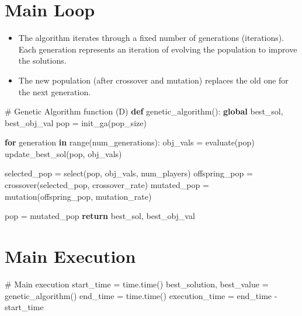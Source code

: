\documentclass[
  letterpaper,
  DIV=11,
  numbers=noendperiod]{scrreprt}
\newenvironment{Shaded}{\begin{snugshade}}{\end{snugshade}}
\newcommand{\BuiltInTok}[1]{\textcolor[rgb]{0.00,0.23,0.31}{#1}}
\newcommand{\CommentTok}[1]{\textcolor[rgb]{0.37,0.37,0.37}{#1}}
\newcommand{\ControlFlowTok}[1]{\textcolor[rgb]{0.00,0.23,0.31}{\textbf{#1}}}
\newcommand{\KeywordTok}[1]{\textcolor[rgb]{0.00,0.23,0.31}{\textbf{#1}}}
\newcommand{\NormalTok}[1]{\textcolor[rgb]{0.00,0.23,0.31}{#1}}
\newcommand{\OperatorTok}[1]{\textcolor[rgb]{0.37,0.37,0.37}{#1}}
\providecommand{\tightlist}{%
  \setlength{\itemsep}{0pt}\setlength{\parskip}{0pt}}\usepackage{longtable,booktabs,array}
\begin{document}
\section{Main Loop}\label{main-loop-3}

\begin{itemize}
\tightlist
\item
  The algorithm iterates through a fixed number of generations
  (iterations). Each generation represents an iteration of evolving the
  population to improve the solutions.
\item
  The new population (after crossover and mutation) replaces the old one
  for the next generation.
\end{itemize}

\begin{Shaded}
\begin{Highlighting}[]
\CommentTok{\# Genetic Algorithm function (D)}
\KeywordTok{def}\NormalTok{ genetic\_algorithm():}
    \KeywordTok{global}\NormalTok{ best\_sol, best\_obj\_val}
\NormalTok{    pop }\OperatorTok{=}\NormalTok{ init\_ga(pop\_size)}
    
    \ControlFlowTok{for}\NormalTok{ generation }\KeywordTok{in} \BuiltInTok{range}\NormalTok{(num\_generations):}
\NormalTok{        obj\_vals }\OperatorTok{=}\NormalTok{ evaluate(pop)}
\NormalTok{        update\_best\_sol(pop, obj\_vals)}
        
\NormalTok{        selected\_pop }\OperatorTok{=}\NormalTok{ select(pop, obj\_vals, num\_players)}
\NormalTok{        offspring\_pop }\OperatorTok{=}\NormalTok{ crossover(selected\_pop, crossover\_rate)}
\NormalTok{        mutated\_pop }\OperatorTok{=}\NormalTok{ mutation(offspring\_pop, mutation\_rate)}
        
\NormalTok{        pop }\OperatorTok{=}\NormalTok{ mutated\_pop  }
    \ControlFlowTok{return}\NormalTok{ best\_sol, best\_obj\_val}
\end{Highlighting}
\end{Shaded}

\section{Main Execution}\label{main-execution-4}

\begin{Shaded}
\begin{Highlighting}[]
\CommentTok{\# Main execution}
\NormalTok{start\_time }\OperatorTok{=}\NormalTok{ time.time()}
\NormalTok{best\_solution, best\_value }\OperatorTok{=}\NormalTok{ genetic\_algorithm()}
\NormalTok{end\_time }\OperatorTok{=}\NormalTok{ time.time()}
\NormalTok{execution\_time }\OperatorTok{=}\NormalTok{ end\_time }\OperatorTok{{-}}\NormalTok{ start\_time}
\end{Highlighting}
\end{Shaded}
\end{document}
